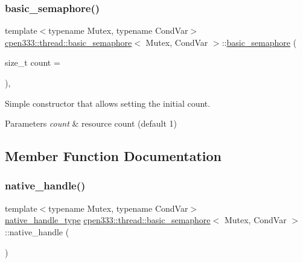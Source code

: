 \subsubsection{\texorpdfstring{basic\+\_\+semaphore()}{basic\_semaphore()}}
{\footnotesize\ttfamily template$<$typename Mutex, typename Cond\+Var$>$ \\
\hyperlink{classcpen333_1_1thread_1_1basic__semaphore}{cpen333\+::thread\+::basic\+\_\+semaphore}$<$ Mutex, Cond\+Var $>$\+::\hyperlink{classcpen333_1_1thread_1_1basic__semaphore}{basic\+\_\+semaphore} (\begin{DoxyParamCaption}\item[{size\+\_\+t}]{count = {} }\end{DoxyParamCaption})\hspace{0.3cm}{\ttfamily [inline]}, {\ttfamily [explicit]}}



Simple constructor that allows setting the initial count. 


\begin{DoxyParams}{Parameters}
{\em count} & resource count (default 1) \\
\hline
\end{DoxyParams}


\subsection{Member Function Documentation}
\mbox{\label{classcpen333_1_1thread_1_1basic__semaphore_a3c3cd804e1aaa10f414820867f2e3798}} 
\subsubsection{\texorpdfstring{native\+\_\+handle()}{native\_handle()}}
{\footnotesize\ttfamily template$<$typename Mutex, typename Cond\+Var$>$ \\
\hyperlink{classcpen333_1_1thread_1_1basic__semaphore_a22e2293b6882f2bf4312aeb167a0b409}{native\+\_\+handle\+\_\+type} \hyperlink{classcpen333_1_1thread_1_1basic__semaphore}{cpen333\+::thread\+::basic\+\_\+semaphore}$<$ Mutex, Cond\+Var $>$\+::native\+\_\+handle (\begin{DoxyParamCaption}{ }\end{DoxyParamCaption})\hspace{0.3cm}{\ttfamily [inline]}}



